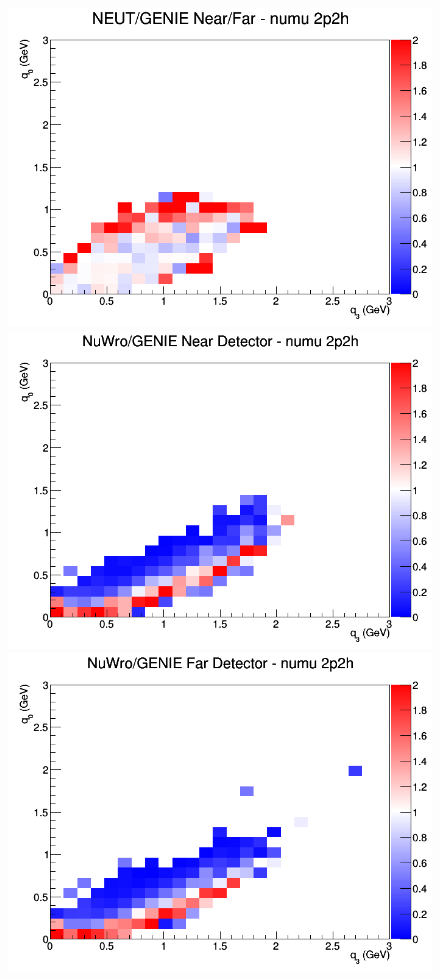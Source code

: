 \begin{figure}[h]
\endminipage
{}
\includegraphics[width=\linewidth]{eff_q0_q3/LAr/ratios/2p2h_NEUT_GENIE_numu_NF_q3_q0.png}
\endminipage
\newline
{}
\includegraphics[width=\linewidth]{eff_q0_q3/LAr/ratios/2p2h_NuWro_GENIE_numu_near_q3_q0.png}
\endminipage
{}
\includegraphics[width=\linewidth]{eff_q0_q3/LAr/ratios/2p2h_NuWro_GENIE_numu_far_q3_q0.png}

\end{figure}

